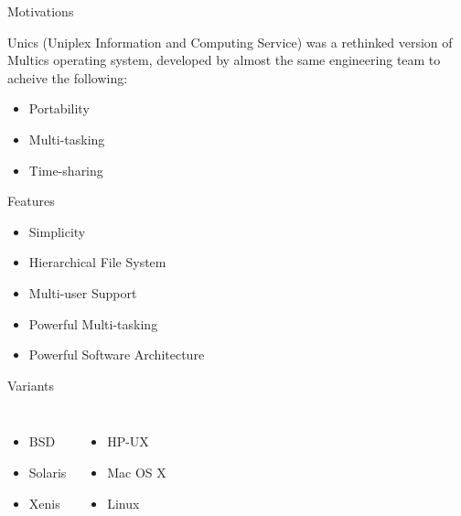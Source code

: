 \documentclass[compress]{beamer}
\begin{document}
\begin{slide}
	\begin{block}{Motivations}

	Unics (Uniplex Information and Computing Service) was a rethinked version of Multics operating system, developed by almost the same engineering team to acheive the following:

	\begin{itemize}
	\item[] Portability
	\item[] Multi-tasking
	\item[] Time-sharing
	\end{itemize}

	\end{block}
\end{slide}

\begin{slide}
	\begin{block}{Features}

	\begin{itemize}
	\item[] \alert{Simplicity}
	\item[] Hierarchical File System
	\item[] Multi-user Support
	\item[] Powerful Multi-tasking
	\item[] Powerful Software Architecture
	\end{itemize}

	\end{block}
\end{slide}

\begin{slide}
	\begin{block}{Variants}

	\begin{columns}
		\begin{itemize}
		\item[] BSD
		\item[] Solaris
		\item[] Xenis
		\end{itemize}
		\begin{itemize}
		\item[] HP-UX
		\item[] Mac OS X
		\item[] Linux
		\end{itemize}
	\end{columns}

	\end{block}
\end{slide}
\end{document}
